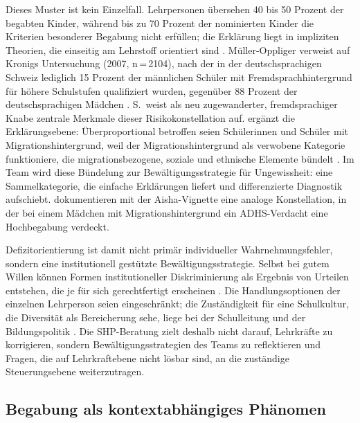 \documentclass[ngerman, a4paper]{article}
\begin{document}
Dieses Muster ist kein Einzelfall. Lehrpersonen übersehen 40 bis 50 Prozent der
begabten Kinder, während bis zu 70 Prozent der nominierten Kinder die Kriterien
besonderer Begabung nicht erfüllen; die Erklärung liegt in impliziten Theorien,
die einseitig am Lehrstoff orientiert sind
\parencite[vgl.][S.\,228]{muelleroppliger2021paeddiagnostik}. Müller-Oppliger verweist auf Kronigs Untersuchung (2007, n\,=\,2104), nach der in
der deutschsprachigen Schweiz lediglich 15 Prozent der männlichen Schüler mit
Fremdsprachhintergrund für höhere Schulstufen qualifiziert wurden, gegenüber
88 Prozent der deutschsprachigen Mädchen
\parencite[vgl.][S.\,38]{muelleroppliger2021plurale}. S.~weist als neu
zugewanderter, fremdsprachiger Knabe zentrale Merkmale dieser Risikokonstellation
auf.
\textcite[S.\,84]{horvath2021elite} ergänzt die Erklärungsebene: Überproportional
betroffen seien Schülerinnen und Schüler mit Migrationshintergrund, weil der
Migrationshintergrund als verwobene Kategorie funktioniere, die
migrationsbezogene, soziale und ethnische Elemente bündelt
\parencite[vgl.][S.\,85]{horvath2021elite}. Im Team wird diese Bündelung zur
Bewältigungsstrategie für Ungewissheit: eine Sammelkategorie, die einfache
Erklärungen liefert und differenzierte Diagnostik aufschiebt.
\textcite[S.\,247]{gauckreimann2021psychdiagnostik} dokumentieren mit der
Aisha-Vignette eine analoge Konstellation, in der bei einem Mädchen mit
Migrationshintergrund ein ADHS-Verdacht eine Hochbegabung verdeckt.

Defizitorientierung ist damit nicht primär individueller Wahrnehmungsfehler,
sondern eine institutionell gestützte Bewältigungsstrategie. Selbst bei gutem Willen
können Formen institutioneller Diskriminierung als Ergebnis von Urteilen entstehen, die je
für sich gerechtfertigt erscheinen
\parencite[vgl.][S.\,84\psq]{horvath2021elite}. Die Handlungsoptionen der einzelnen
Lehrperson seien eingeschränkt; die Zuständigkeit für eine Schulkultur, die
Diversität als Bereicherung sehe, liege bei der Schulleitung und der
Bildungspolitik \parencite[vgl.][S.\,423\psq]{wagener2021bfhemmendfoerdernd}. Die
SHP-Beratung zielt deshalb nicht darauf, Lehrkräfte zu korrigieren, sondern
Bewältigungsstrategien des Teams zu reflektieren und Fragen, die auf
Lehrkraftebene nicht lösbar sind, an die zuständige Steuerungsebene weiterzutragen.

\subsection{Begabung als kontextabhängiges Phänomen}
\end{document}
